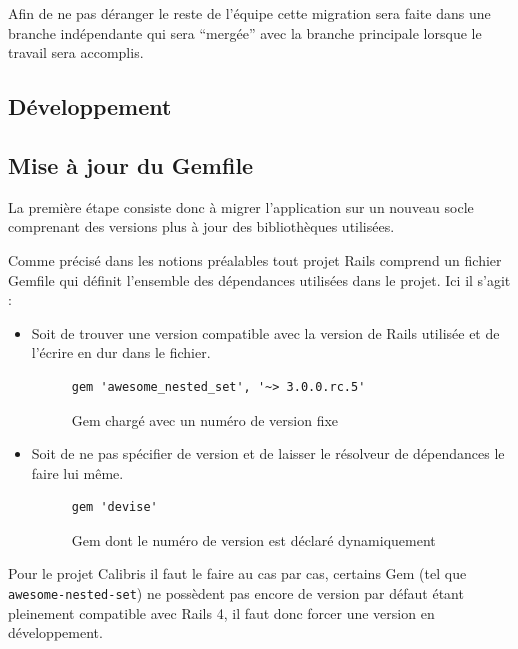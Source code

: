 \documentclass[12pt,a4paper]{book}
\begin{document}
Afin de ne pas déranger le reste de l'équipe cette migration sera faite dans une branche indépendante qui sera ``mergée'' avec la branche principale lorsque le travail sera accomplis.

\subsection{Développement}

\subsection{Mise à jour du Gemfile}

La première étape consiste donc à migrer l'application sur un nouveau socle comprenant des versions plus à jour des bibliothèques utilisées.

Comme précisé dans les notions préalables tout projet Rails comprend un fichier Gemfile qui définit l'ensemble des dépendances utilisées dans le projet. Ici il s'agit :
\begin{itemize}
  \item Soit de trouver une version compatible avec la version de Rails utilisée et de l'écrire en dur dans le fichier.
  
    \begin{figure}[h]
    \lstset{language=ruby}
    \begin{lstlisting}
gem 'awesome_nested_set', '~> 3.0.0.rc.5'
    \end{lstlisting}
     \caption{Gem chargé avec un numéro de version fixe}
    \end{figure}
    
  \item Soit de ne pas spécifier de version et de laisser le résolveur de dépendances le faire lui même.
  
    \begin{figure}[h]
    \lstset{language=ruby}
    \begin{lstlisting}
gem 'devise'
    \end{lstlisting}
     \caption{Gem dont le numéro de version est déclaré dynamiquement}
    \end{figure}
\end{itemize}

Pour le projet Calibris il faut le faire au cas par cas, certains Gem (tel que \texttt{awesome-nested-set}) ne possèdent pas encore de version par défaut étant pleinement compatible avec Rails 4, il faut donc forcer une version en développement.
\end{document}
